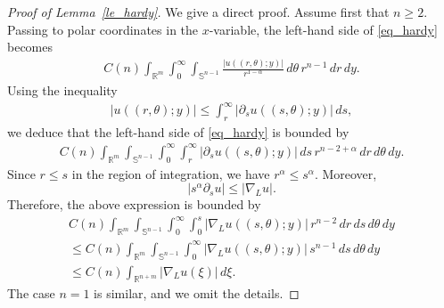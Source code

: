 \documentclass[12pt]{amsart}
\theoremstyle{plain}
\theoremstyle{definition}
\numberwithin{equation}{section}
\begin{document}
\begin{proof}[Proof of Lemma~\ref{le_hardy}]
We give a direct proof. Assume first that \(n\ge 2\). Passing to polar coordinates in the \(x\)-variable, the left-hand side of \eqref{eq_hardy} becomes
\begin{align*}
    C(n) \int_{\mathbb{R}^m} \int_0^\infty \int_{\mathbb{S}^{n-1}}
    \frac{|u((r,\theta);y)|}{r^{1-\alpha}}\, d\theta\, r^{n-1}\, dr\, dy.
\end{align*}
Using the inequality
\begin{align*}
    |u((r,\theta);y)|
    \le
    \int_r^\infty |\partial_s u((s,\theta);y)|\, ds,
\end{align*}
we deduce that the left-hand side of \eqref{eq_hardy} is bounded by
\begin{align*}
    C(n) \int_{\mathbb{R}^m} \int_{\mathbb{S}^{n-1}} \int_0^\infty \int_r^\infty
    |\partial_s u((s,\theta);y)|\, ds\, r^{n-2+\alpha}\, dr\, d\theta\, dy.
\end{align*}
Since \(r\le s\) in the region of integration, we have \(r^\alpha\le s^\alpha\). Moreover,
\[
|s^\alpha \partial_s u|\le |\nabla_L u|.
\]
Therefore, the above expression is bounded by
\begin{align*}
    C(n) \int_{\mathbb{R}^m} \int_{\mathbb{S}^{n-1}} \int_0^\infty \int_0^s
    |\nabla_L u((s,\theta);y)|\, r^{n-2}\, dr\, ds\, d\theta\, dy
    \\
    \le
    C(n) \int_{\mathbb{R}^m} \int_{\mathbb{S}^{n-1}} \int_0^\infty
    |\nabla_L u((s,\theta);y)|\, s^{n-1}\, ds\, d\theta\, dy
    \\
    \le
    C(n) \int_{\mathbb{R}^{n+m}} |\nabla_L u(\xi)|\, d\xi.
\end{align*}
The case \(n=1\) is similar, and we omit the details.
\end{proof}
\end{document}
